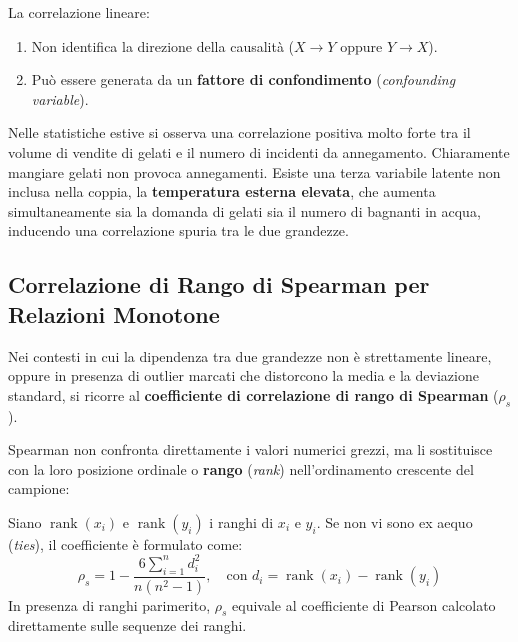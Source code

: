 La correlazione lineare:
\begin{enumerate}
    \item Non identifica la direzione della causalit\`a ($X \to Y$ oppure $Y \to X$).
    \item Pu\`o essere generata da un \textbf{fattore di confondimento} (\textit{confounding variable}).
\end{enumerate}

\begin{example}
Nelle statistiche estive si osserva una correlazione positiva molto forte tra il volume di vendite di gelati e il numero di incidenti da annegamento. Chiaramente mangiare gelati non provoca annegamenti. Esiste una terza variabile latente non inclusa nella coppia, la \textbf{temperatura esterna elevata}, che aumenta simultaneamente sia la domanda di gelati sia il numero di bagnanti in acqua, inducendo una correlazione spuria tra le due grandezze.
\end{example}

\subsection{Correlazione di Rango di Spearman per Relazioni Monotone}
Nei contesti in cui la dipendenza tra due grandezze non \`e strettamente lineare, oppure in presenza di outlier marcati che distorcono la media e la deviazione standard, si ricorre al \textbf{coefficiente di correlazione di rango di Spearman} ($\rho_s$).

Spearman non confronta direttamente i valori numerici grezzi, ma li sostituisce con la loro posizione ordinale o \textbf{rango} (\textit{rank}) nell'ordinamento crescente del campione:

\begin{definition}
Siano $\operatorname{rank}(x_i)$ e $\operatorname{rank}(y_i)$ i ranghi di $x_i$ e $y_i$. Se non vi sono ex aequo (\textit{ties}), il coefficiente \`e formulato come:
\begin{equation}
\rho_s = 1 - \frac{6 \sum_{i=1}^n d_i^2}{n(n^2 - 1)}, \quad \text{con } d_i = \operatorname{rank}(x_i) - \operatorname{rank}(y_i)
\end{equation}
In presenza di ranghi parimerito, $\rho_s$ equivale al coefficiente di Pearson calcolato direttamente sulle sequenze dei ranghi.
\end{definition}

